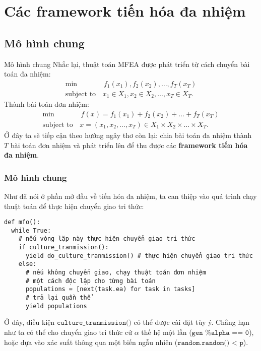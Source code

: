 \section{Các framework tiến hóa đa nhiệm} %
\label{sec:Các framework tiến hóa đa nhiệm}

\subsection{Mô hình chung} %
\label{sub:Mô hình chung}

\begin{frame}{Mô hình chung}
Nhắc lại, thuật toán MFEA được phát triển từ cách chuyển bài toán đa
nhiệm:
\begin{align*}
  \min &\, f_{1}(x_{1}), f_{2}(x_{2}), \ldots , f_{T}(x_{T})\\
  \text{subject to}\, &x_{1} \in X_{1}, x_{2} \in X_{2},
  \ldots , x_{T} \in X_{T}.
\end{align*}
Thành bài toán đơn nhiệm:
\begin{align*}
  \min &\, f(x) = f_{1}(x_{1})+ f_{2}(x_{2})+ \ldots +
  f_{T}(x_{T})\\
  \text{subject to}\, &x = (x_{1}, x_{2}, \ldots, x_{T}) \in X_{1} \times  X_{2}
  \times  \ldots  \times X_{T}.
\end{align*}
Ở đây ta sẽ tiếp cận theo hướng ngây thơ còn lại: chia bài toán đa nhiệm thành
\( T \) bài toán đơn nhiệm và phát triển lên để thu được các \textbf{framework
tiến hóa đa nhiệm}.
\end{frame}

\begin{frame}[fragile]
\frametitle{Mô hình chung}
Như đã nói ở phần mở đầu về tiến hóa đa nhiệm, ta can thiệp vào quá trình
chạy thuật toán để thực hiện chuyển giao tri thức:
\begin{verbatim}
def mfo():
  while True:
    # nếu vòng lặp này thực hiện chuyển giao tri thức
    if culture_tranmission():
      yield do_culture_tranmission() # thực hiện chuyển giao tri thức
    else:
      # nếu không chuyển giao, chạy thuật toán đơn nhiệm
      # một cách độc lập cho từng bài toán
      populations = [next(task.ea) for task in tasks]
      # trả lại quần thể
      yield populations
\end{verbatim}

Ở đây, điều kiện \( \texttt{culture\_tranmission()} \) có thể được cài đặt tùy ý.
Chẳng hạn như ta có thể cho chuyển giao tri thức cứ \( \alpha \) thế hệ một lần
(\( \texttt{gen \% alpha == 0} \)),
hoặc dựa vào xác suất thông qua một biến ngẫu nhiên (\( \texttt{random.random()
< p} \)).
\end{frame}


